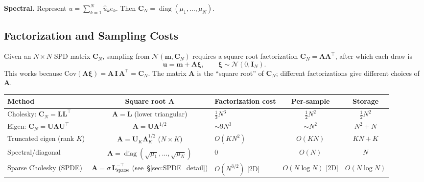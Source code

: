 \documentclass[11pt]{article}
\newcommand{\Cov}{\mathbf{C}}
\newcommand{\bL}{\mathbf{L}}
\newcommand{\bU}{\mathbf{U}}
\newcommand{\bA}{\mathbf{A}}
\newcommand{\bu}{\mathbf{u}}
\newcommand{\bmm}{\mathbf{m}}
\newcommand{\bxi}{\boldsymbol{\xi}}
\newcommand{\bLambda}{\boldsymbol{\Lambda}}
\DeclareMathOperator{\diag}{diag}
\begin{document}
\medskip\noindent\textbf{Spectral.}  Represent $u = \sum_{k=1}^N \hat{u}_k e_k$.  Then $\Cov_N = \diag(\mu_1,\ldots,\mu_N)$.

\subsection{Factorization and Sampling Costs}\label{sec:costs}

Given an $N \times N$ SPD matrix $\Cov_N$, sampling from $\mathcal{N}(\bmm, \Cov_N)$ requires a square-root factorization $\Cov_N = \bA\bA^\top$, after which each draw is
\[
  \bu = \bmm + \bA\bxi, \qquad \bxi \sim \mathcal{N}(0, \mathbf{I}_N).
\]
This works because $\text{Cov}(\bA\bxi) = \bA\, \mathbf{I}\, \bA^\top = \Cov_N$.  The matrix $\bA$ is the ``square root'' of $\Cov_N$; different factorizations give different choices of $\bA$.

\begin{center}
\renewcommand{\arraystretch}{1.6}
\begin{tabular}{@{}p{4.5cm}cp{2.2cm}cc@{}}
\toprule
\textbf{Method} & \textbf{Square root $\bA$} & \textbf{Factorization cost} & \textbf{Per-sample} & \textbf{Storage} \\
\midrule
Cholesky: $\Cov_N = \bL\bL^\top$ 
  & $\bA = \bL$ (lower triangular) 
  & $\frac{1}{3}N^3$ 
  & $\frac{1}{2}N^2$ 
  & $\frac{1}{2}N^2$ \\[4pt]
Eigen: $\Cov_N = \bU\bLambda\bU^\top$ 
  & $\bA = \bU\bLambda^{1/2}$ 
  & $\sim 9 N^3$ 
  & $\sim N^2$ 
  & $N^2 + N$ \\[4pt]
Truncated eigen (rank $K$) 
  & $\bA = \bU_K\bLambda_K^{1/2}$ ($N \times K$) 
  & $O(KN^2)$ 
  & $O(KN)$ 
  & $KN + K$ \\[4pt]
Spectral/diagonal 
  & $\bA = \diag(\sqrt{\mu_1},\ldots,\sqrt{\mu_N})$ 
  & $0$ 
  & $O(N)$ 
  & $N$ \\[4pt]
Sparse Cholesky (SPDE) 
  & $\bA = \sigma\, \bL_{\text{sparse}}^{-\top}$ (see~\S\ref{sec:SPDE_detail})
  & $O(N^{3/2})$ [2D] 
  & $O(N \log N)$ [2D] 
  & $O(N\log N)$ \\
\bottomrule
\end{tabular}
\end{center}
\end{document}

